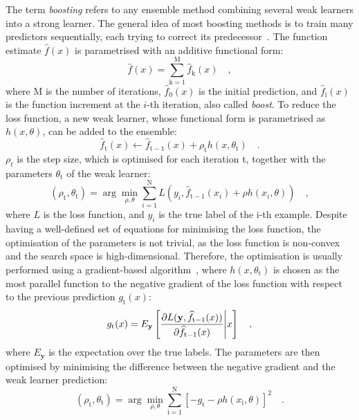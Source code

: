 The term \emph{boosting} refers to any ensemble method combining several weak learners into a strong learner. The general idea of most boosting methods is to train many predictors sequentially, each trying to correct its predecessor~\cite{geron2022hands}. The function estimate $\widehat{f}(x)$ is parametrised with an additive functional form:
\begin{equation*}
    \widehat{f}(x) = \sum_{\mathrm{k}=1}^{\mathrm{M}} \widehat{f}_\mathrm{k}(x)\quad ,
\end{equation*}
where M is the number of iterations, $\widehat{f}_\mathrm{0}(x)$ is the initial prediction, and $\widehat{f}_\mathrm{i}(x)$ is the function increment at the $i$-th iteration, also called \emph{boost}. To reduce the loss function, a new weak learner, whose functional form is parametrised as $h(x,\theta)$, can be added to the ensemble:
\begin{equation*}
    \widehat{f}_\mathrm{t}(x) \leftarrow \widehat{f}_{\mathrm{t}-1}(x) + \rho_\mathrm{t} h(x,\theta_\mathrm{t})\quad .
\end{equation*}
$\rho_t$ is the step size, which is optimised for each iteration t, together with the parameters $\theta_\mathrm{t}$ of the weak learner:
\begin{equation*}
    (\rho_\mathrm{t}, \theta_\mathrm{t}) = \arg\min_{\rho,\theta} \sum_{{i}=1}^{\mathrm{N}} L\left(y_i, \widehat{f}_{\mathrm{t}-1}(x_i) + \rho h(x_i,\theta)\right)\quad ,
\end{equation*}
where $L$ is the loss function, and $y_i$ is the true label of the i-th example. Despite having a well-defined set of equations for minimising the loss function, the optimisation of the parameters is not trivial, as the loss function is non-convex and the search space is high-dimensional. Therefore, the optimisation is usually performed using a gradient-based algorithm~\cite{friedman2001greedy,natekin2013gradient}, where $h(x,\theta_\mathrm{t})$ is chosen as the most parallel function to the negative gradient of the loss function with respect to the previous prediction $g_\mathrm{t}(x)$:
\begin{equation*}
    g_\mathrm{t}(x) = E_{\mathbf{y}}\left[ \frac{\partial L(\mathbf{y},\widehat{f}_{\mathrm{t}-1}(x))}{\partial \widehat{f}_{\mathrm{t}-1}(x)} \Bigg{|} x \right] \quad ,
\end{equation*}
where $E_{\mathbf{y}}$ is the expectation over the true labels. The parameters are then optimised by minimising the difference between the negative gradient and the weak learner prediction:
\begin{equation*}
    (\rho_\mathrm{t}, \theta_\mathrm{t}) = \arg\min_{\rho,\theta} \sum_{\mathrm{i}=1}^{\mathrm{N}} \left[-g_\mathrm{t} - \rho h(x_\mathrm{i},\theta)\right]^{2}\quad .
\end{equation*}

